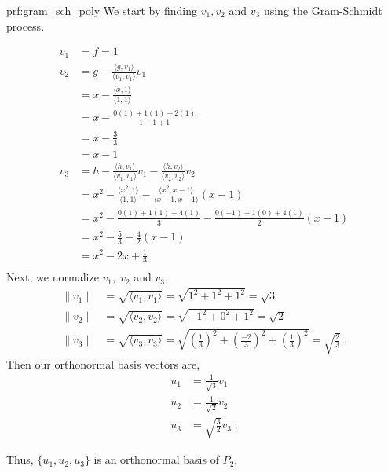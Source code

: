\begin{prf}{prf:gram_sch_poly} %
We start by finding $v_1, v_2$ and $v_3$ using the Gram-Schmidt process.

\begin{align*}
    v_1 &= f = 1 \\
    v_2 &= g - \frac{\langle g,v_1 \rangle}{\langle v_1, v_1 \rangle}v_1 \\
    &= x - \frac{\langle x,1 \rangle}{\langle 1, 1 \rangle} \\
    &= x - \frac{0(1) + 1(1) + 2(1)}{1+1+1}\\
    &= x - \frac{3}{3} \\
    &= x - 1 \\
    v_3 &= h - \frac{\langle h,v_1 \rangle}{\langle v_1, v_1 \rangle}v_1 - \frac{\langle h,v_2 \rangle}{\langle v_2, v_2 \rangle}v_2 \\
    &= x^2 - \frac{\langle x^2,1 \rangle}{\langle 1, 1 \rangle} - \frac{\langle x^2,x-1 \rangle}{\langle x-1, x-1 \rangle}(x-1) \\
    &= x^2 - \frac{0(1) + 1(1) + 4(1)}{3} - \frac{0(-1) + 1(0) + 4(1)}{2}(x-1)\\
    &= x^2 - \frac{5}{3} - \frac{4}{2}(x-1) \\
    &= x^2 - 2x + \frac{1}{3} \\
\end{align*}
Next, we normalize $v_1, \; v_2$ and $v_3.$
\begin{align*}
    \lVert v_1 \rVert &= \sqrt{\langle v_1, v_1 \rangle} = \sqrt{1^2+1^2+1^2} = \sqrt{3} \\
    \lVert v_2 \rVert &= \sqrt{\langle v_2, v_2 \rangle} = \sqrt{-1^2+0^2+1^2} = \sqrt{2} \\
    \lVert v_3 \rVert &= \sqrt{\langle v_3, v_3 \rangle} = \sqrt{\left(\frac{1}{3}\right)^2 + \left(\frac{-2}{3}\right)^2 + \left(\frac{1}{3}\right)^2} = \sqrt{\frac{2}{3}}\;.
\end{align*}
Then our orthonormal basis vectors are,
\begin{align*}
    u_1 &= \frac{1}{\sqrt{3}}v_1 \\
    u_2 &= \frac{1}{\sqrt{2}}v_2 \\
    u_3 &= \sqrt{\frac{3}{2}}v_3\;.
\end{align*}

\noindent Thus, $\{u_1, u_2, u_3\}$ is an orthonormal basis of $P_2.$

\end{prf}
